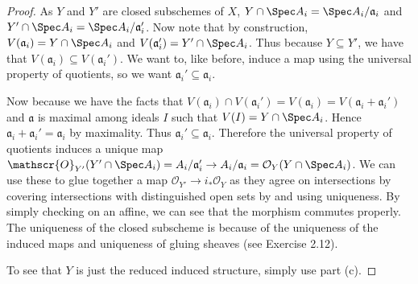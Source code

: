 \begin{proof}
	As $Y $ and $Y' $ are closed subschemes of $X $, $Y\cap \Spec A_i = \Spec A_i / \mathfrak{a}_i $ and $Y' \cap \Spec A_i = \Spec A_i / \mathfrak{a}'_i$.
	Now note that by construction, $V(\mathfrak{a}_i) = Y\cap \Spec A_i $ and $V(\mathfrak{a}'_i) = Y'\cap \Spec A_i $. 
	Thus because $Y \subseteq Y' $, we have that $V(\mathfrak{a}_i) \subseteq V(\mathfrak{a}_i') $.
	We want to, like before, induce a map using the universal property of quotients, so we want $\mathfrak{a}_i' \subseteq \mathfrak{a}_i $.

	Now because we have the facts that $V(\mathfrak{a}_i) \cap V(\mathfrak{a}_i') = V(\mathfrak{a}_i) = V(\mathfrak{a}_i + \mathfrak{a}_i') $ and $\mathfrak{a} $ is maximal among ideals $I $ such that $V(I) = Y\cap \Spec A_i $.
	Hence $\mathfrak{a}_i + \mathfrak{a}_i' = \mathfrak{a}_i$ by maximality. 
	Thus $\mathfrak{a}_i' \subseteq \mathfrak{a}_i $.
	Therefore the universal property of quotients induces a unique map $\mathscr{O}_{Y'}(Y'\cap \Spec A_i) = A_i / \mathfrak{a}'_i \to A_i / \mathfrak{a}_i = \mathcal{O}_{Y}(Y\cap \Spec A_i)$.
	We can use these to glue together a map $\mathcal{O}_{Y'}\to i_\ast\mathcal{O}_Y$ as they agree on intersections by covering intersections with distinguished open sets by  and using uniqueness.
	By simply checking on an affine, we can see that the morphism commutes properly.
	The uniqueness of the closed subscheme is because of the uniqueness of the induced maps and uniqueness of gluing sheaves (see Exercise 2.12).

	To see that $Y $ is just the reduced induced structure, simply use part (c).
\end{proof}

